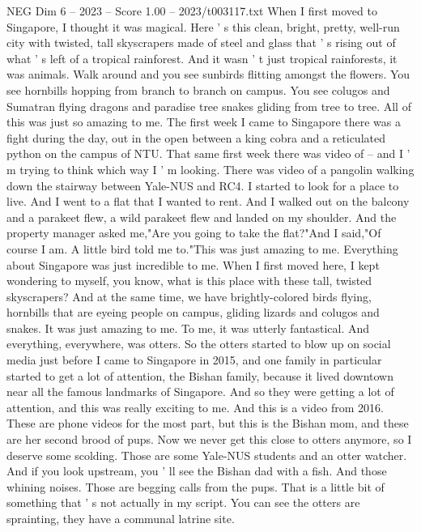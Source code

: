 \begin{textsample}{NEG Dim 6 – 2023 – Score 1.00 – 2023/t003117.txt}  \label{ex:f6_neg_007}
When I first moved to Singapore, I thought it was magical.
Here ' s this clean, bright, pretty, well-run city with twisted, tall skyscrapers made of steel and glass that ' s rising out of what ' s left of a tropical rainforest.
And it wasn ' t just tropical rainforests, it was animals.
Walk around and you see sunbirds flitting amongst the flowers.
You see hornbills hopping from branch to branch on campus.
You see colugos and Sumatran flying dragons and paradise tree snakes gliding from tree to tree.
All of this was just so amazing to me.
The first week I came to Singapore there was a fight during the day, out in the open between a king cobra and a reticulated python on the campus of NTU.
That same first week there was video of -- and I ' m trying to think which way I ' m looking.
There was video of a pangolin walking down the stairway between Yale-NUS and RC4.
I started to look for a place to live.
And I went to a flat that I wanted to rent.
And I walked out on the balcony and a parakeet flew, a wild parakeet flew and landed on my shoulder.
And the property manager asked me,"Are you going to take the flat?"And I said,"Of course I am.
A little bird told me to."This was just amazing to me.
Everything about Singapore was just incredible to me.
When I first moved here, I kept wondering to myself, you know, what is this place with these tall, twisted skyscrapers?
And at the same time, we have brightly-colored birds flying, hornbills that are eyeing people on campus, gliding lizards and colugos and snakes.
It was just amazing to me.
To me, it was utterly fantastical.
And everything, everywhere, was otters.
So the otters started to blow up on social media just before I came to Singapore in 2015, and one family in particular started to get a lot of attention, the Bishan family, because it lived downtown near all the famous landmarks of Singapore.
And so they were getting a lot of attention, and this was really exciting to me.
And this is a video from 2016.
These are phone videos for the most part, but this is the Bishan mom, and these are her second brood of pups.
Now we never get this close to otters anymore, so I deserve some scolding.
Those are some Yale-NUS students and an otter watcher.
And if you look upstream, you ' ll see the Bishan dad with a fish.
And those whining noises.
Those are begging calls from the pups.
That is a little bit of something that ' s not actually in my script.
You can see the otters are sprainting, they have a communal latrine site.

\end{textsample}
